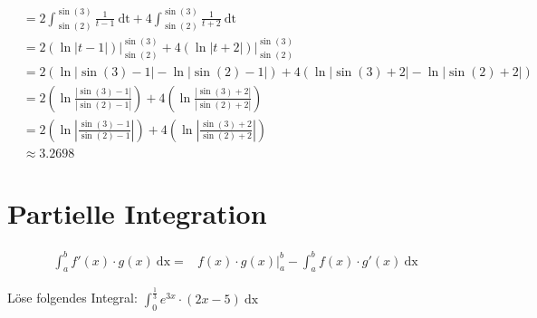 \documentclass[11pt, a4paper]{article}
\providecommand{\abs}[1]{\left\lvert#1\right\rvert}
\providecommand{\dx}{\ \mathrm{dx}}
\providecommand{\dt}{\ \mathrm{dt}}
\begin{document}
\begin{align*}
	 &= 2 \int_{\sin(2)}^{\sin(3)} \frac{1}{t-1} \dt + 4 \int_{\sin(2)}^{\sin(3)} \frac{1}{t+2} \dt \\
	 &= 2 \left. \left( \ln\abs{t-1} \right) \right\vert_{\sin(2)}^{\sin(3)} + 4 \left. \left( \ln\abs{t+2} \right) \right\vert_{\sin(2)}^{\sin(3)} \\
	 &= 2 \left( \ln\abs{\sin(3)-1} - \ln\abs{\sin(2)-1} \right) + 4 \left( \ln\abs{\sin(3) + 2} - \ln\abs{\sin(2) + 2} \right) \\
	 &= 2 \left( \ln \frac{\abs{\sin(3)-1}}{\abs{\sin(2)-1}} \right) + 4 \left( \ln \frac{\abs{\sin(3) + 2}}{\abs{\sin(2) + 2}} \right) \\
	 &= 2 \left( \ln \abs{\frac{\sin(3)-1}{\sin(2)-1}} \right) + 4 \left( \ln \abs{\frac{\sin(3) + 2}{\sin(2) + 2}} \right) \\
	 &\approx 3.2698
\end{align*}

\newpage
\section{Partielle Integration} %
\begin{align}
	\int_a^b f'(x) \cdot g(x) \dx =& f(x) \cdot g(x)\vert_a^b - \int_a^b f(x) \cdot g'(x) \dx
	\label{eq:partielleIntegration}
\end{align}

\newcommand{\lowerBorder}{{0}}
\newcommand{\upperBorder}{{\frac{1}{3}}}
Löse folgendes Integral: $\displaystyle \int_\lowerBorder^\upperBorder e^{3x} \cdot (2x - 5) \dx$
\end{document}
